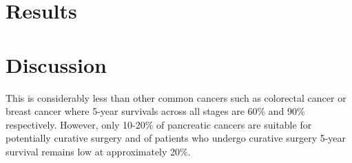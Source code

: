 \section{Results}


\section{Discussion}

 This is considerably less than other common cancers such as colorectal cancer or breast cancer where 5-year survivals across all stages are 60\% and 90\% respectively. However, only 10-20\% of pancreatic cancers are suitable for potentially curative surgery and of patients who undergo curative surgery 5-year survival remains low at approximately 20\%.\parencite{cancerresearchuk_cancer_2014}